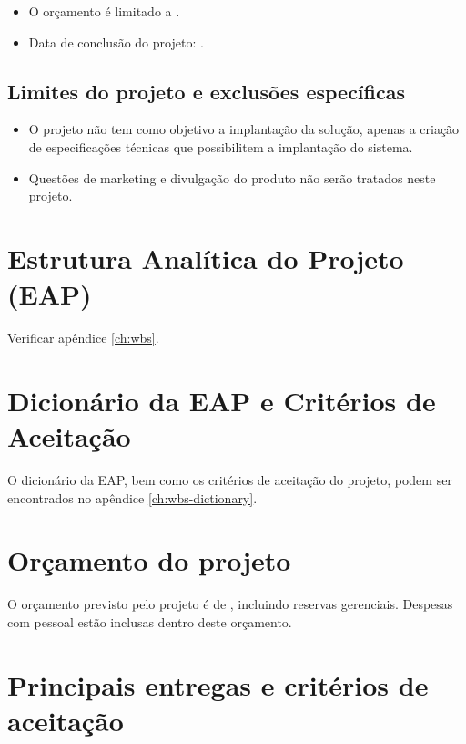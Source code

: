 \begin{itemize}
	\item O orçamento é limitado a \maximumBudget{}.
	\item Data de conclusão do projeto: \maximumDeadline{}.
\end{itemize}

\subsection{Limites do projeto e exclusões específicas}

\begin{itemize}
	\item O projeto não tem como objetivo a implantação da solução, apenas a criação de especificações técnicas que possibilitem a implantação do sistema.
	\item Questões de marketing e divulgação do produto não serão tratados neste projeto.
\end{itemize}

\section{Estrutura Analítica do Projeto (EAP)}

Verificar apêndice \ref{ch:wbs}.

\section{Dicionário da EAP e Critérios de Aceitação}

O dicionário da EAP, bem como os critérios de aceitação do projeto, podem ser encontrados no apêndice \ref{ch:wbs-dictionary}.

\section{Orçamento do projeto}

O orçamento previsto pelo projeto é de \maximumBudget{}, incluindo reservas gerenciais. Despesas com pessoal estão inclusas dentro deste orçamento.

\section{Principais entregas e critérios de aceitação}

